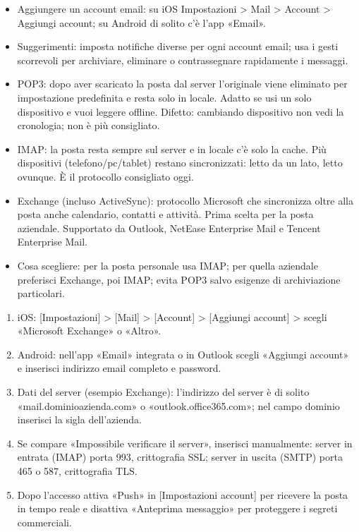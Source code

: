 
\begin{itemize}
  \item Aggiungere un account email: su iOS Impostazioni > Mail > Account > Aggiungi account; su Android di solito c'è l'app «Email».
  \item Suggerimenti: imposta notifiche diverse per ogni account email; usa i gesti scorrevoli per archiviare, eliminare o contrassegnare rapidamente i messaggi.
\end{itemize}


\begin{itemize}
  \item POP3: dopo aver scaricato la posta dal server l'originale viene eliminato per impostazione predefinita e resta solo in locale. Adatto se usi un solo dispositivo e vuoi leggere offline. Difetto: cambiando dispositivo non vedi la cronologia; non è più consigliato.
  \item IMAP: la posta resta sempre sul server e in locale c'è solo la cache. Più dispositivi (telefono/pc/tablet) restano sincronizzati: letto da un lato, letto ovunque. È il protocollo consigliato oggi.
  \item Exchange (incluso ActiveSync): protocollo Microsoft che sincronizza oltre alla posta anche calendario, contatti e attività. Prima scelta per la posta aziendale. Supportato da Outlook, NetEase Enterprise Mail e Tencent Enterprise Mail.
  \item Cosa scegliere: per la posta personale usa IMAP; per quella aziendale preferisci Exchange, poi IMAP; evita POP3 salvo esigenze di archiviazione particolari.
\end{itemize}


\begin{enumerate}
  \item iOS: [Impostazioni] > [Mail] > [Account] > [Aggiungi account] > scegli «Microsoft Exchange» o «Altro».
  \item Android: nell'app «Email» integrata o in Outlook scegli «Aggiungi account» e inserisci indirizzo email completo e password.
  \item Dati del server (esempio Exchange): l'indirizzo del server è di solito «mail.dominioazienda.com» o «outlook.office365.com»; nel campo dominio inserisci la sigla dell'azienda.
  \item Se compare «Impossibile verificare il server», inserisci manualmente: server in entrata (IMAP) porta 993, crittografia SSL; server in uscita (SMTP) porta 465 o 587, crittografia TLS.
  \item Dopo l'accesso attiva «Push» in [Impostazioni account] per ricevere la posta in tempo reale e disattiva «Anteprima messaggio» per proteggere i segreti commerciali.
\end{enumerate}

